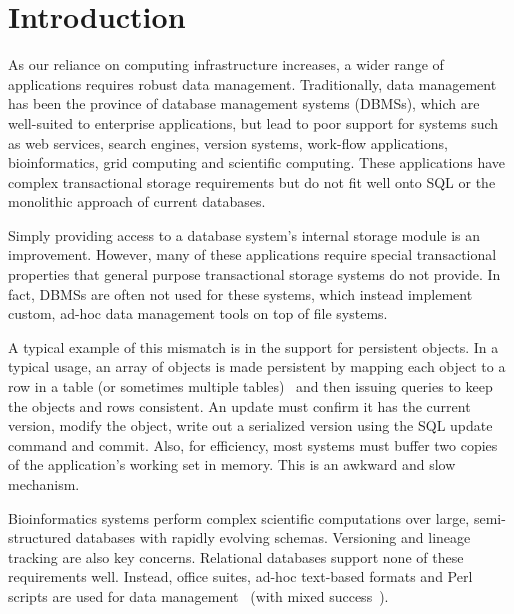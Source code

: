 \documentclass[letterpaper,twocolumn,10pt]{article}
\begin{document}




\section{Introduction}

As our reliance on computing infrastructure increases, a wider range of 
applications requires robust data management.  Traditionally, data management
has been the province of database management systems (DBMSs), which are
well-suited to enterprise applications, but lead to poor support for
systems such as web services, search engines, version systems, work-flow 
applications, bioinformatics, grid computing and scientific computing.  These 
applications have complex transactional storage requirements
but do not fit well
onto SQL or the monolithic approach of current databases.  

Simply providing
access to a database system's internal storage module is an improvement.
However, many of these applications require special transactional properties 
that general purpose transactional storage systems do not provide.  In
fact, DBMSs are often not used for these systems, which instead
implement custom, ad-hoc data management tools on top of file
systems.

A typical example of this mismatch is in the support for
persistent objects.
In a typical usage, an array of objects is made persistent by
mapping each object to a row in a table (or sometimes multiple
tables)~\cite{hibernate} and then issuing queries to keep the objects and
rows consistent. An update must confirm it has the current
version, modify the object, write out a serialized version using the
SQL update command and commit.  Also, for efficiency, most systems must 
buffer two copies of the application's working set in memory.  
This is an awkward and slow mechanism.

Bioinformatics systems perform complex scientific
computations over large, semi-structured databases with rapidly evolving schemas.  Versioning and
lineage tracking are also key concerns.  Relational databases support
none of these requirements well.  Instead, office suites, ad-hoc
text-based formats and Perl scripts are used for data management~\cite{perl} (with mixed success~\cite{excel}).
\end{document}
